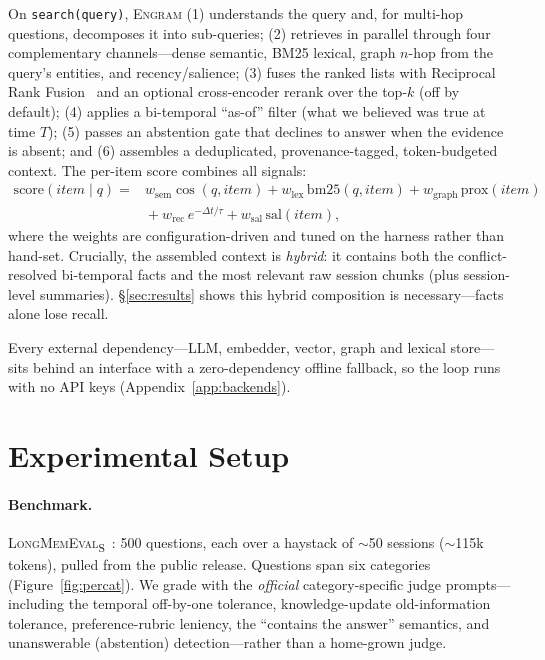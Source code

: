 \documentclass{article}
\newcommand{\engram}{\textsc{Engram}}
\begin{document}
On \texttt{search(query)}, \engram{} (1) understands the query and, for multi-hop questions, decomposes it
into sub-queries; (2) retrieves in parallel through four complementary channels---dense semantic, BM25
lexical, graph $n$-hop from the query's entities, and recency/salience; (3) fuses the ranked lists with
Reciprocal Rank Fusion~\citep{cormack2009rrf} and an optional cross-encoder rerank over the top-$k$ (off by
default); (4) applies a bi-temporal ``as-of'' filter (what we believed was true at time $T$); (5) passes an
abstention gate that declines to answer when the evidence is absent; and (6) assembles a deduplicated,
provenance-tagged, token-budgeted context. The per-item score combines all signals:
\begin{equation}
\label{eq:score}
\begin{split}
\mathrm{score}(\textit{item} \mid q) ={}&
  w_{\text{sem}}\cos(q,\textit{item})
  + w_{\text{lex}}\,\mathrm{bm25}(q,\textit{item})
  + w_{\text{graph}}\,\mathrm{prox}(\textit{item}) \\
  &{}+ w_{\text{rec}}\,e^{-\Delta t/\tau}
  + w_{\text{sal}}\,\mathrm{sal}(\textit{item}),
\end{split}
\end{equation}
where the weights are configuration-driven and tuned on the harness rather than hand-set. Crucially, the
assembled context is \emph{hybrid}: it contains both the conflict-resolved bi-temporal facts and the most
relevant raw session chunks (plus session-level summaries). \S\ref{sec:results} shows this hybrid composition
is necessary---facts alone lose recall.

Every external dependency---LLM, embedder, vector, graph and lexical store---sits behind an interface with
a zero-dependency offline fallback, so the loop runs with no API keys (Appendix~\ref{app:backends}).

\section{Experimental Setup}
\label{sec:setup}

\paragraph{Benchmark.}
\textsc{LongMemEval}\textsubscript{S}~\citep{wu2025longmemeval}: 500 questions, each over a haystack of
$\sim$50 sessions ($\sim$115k tokens), pulled from the public release. Questions span six categories
(Figure~\ref{fig:percat}). We grade with the \emph{official} category-specific judge prompts---including the
temporal off-by-one tolerance, knowledge-update old-information tolerance, preference-rubric leniency, the
``contains the answer'' semantics, and unanswerable (abstention) detection---rather than a home-grown judge.
\end{document}
